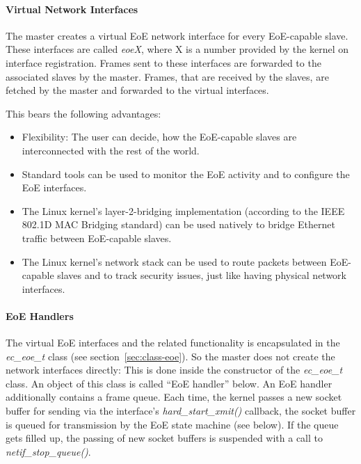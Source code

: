 \documentclass[a4paper,12pt,BCOR6mm,bibtotoc,idxtotoc]{scrbook}
\begin{document}
\paragraph{Virtual Network Interfaces}

The master creates a virtual EoE network interface for every
EoE-capable slave. These interfaces are called \textit{eoeX}, where X
is a number provided by the kernel on interface registration. Frames
sent to these interfaces are forwarded to the associated slaves by the
master. Frames, that are received by the slaves, are fetched by the
master and forwarded to the virtual interfaces.

This bears the following advantages:

\begin{itemize}
\item Flexibility: The user can decide, how the EoE-capable slaves are
  interconnected with the rest of the world.
\item Standard tools can be used to monitor the EoE activity and to
  configure the EoE interfaces.
\item The Linux kernel's layer-2-bridging implementation (according to
  the IEEE 802.1D MAC Bridging standard) can be used natively to
  bridge Ethernet traffic between EoE-capable slaves.
\item The Linux kernel's network stack can be used to route packets
  between EoE-capable slaves and to track security issues, just like
  having physical network interfaces.
\end{itemize}

\paragraph{EoE Handlers}

The virtual EoE interfaces and the related functionality is encapsulated in the
\textit{ec\_eoe\_t} class (see section~\ref{sec:class-eoe}).  So the master
does not create the network interfaces directly: This is done inside the
constructor of the \textit{ec\_eoe\_t} class. An object of this class is called
``EoE handler'' below. An EoE handler additionally contains a frame queue. Each
time, the kernel passes a new socket buffer for sending via the interface's
\textit{hard\_start\_xmit()} callback, the socket buffer is queued for
transmission by the EoE state machine (see below). If the queue gets filled up,
the passing of new socket buffers is suspended with a call to
\textit{netif\_stop\_queue()}.
\end{document}
